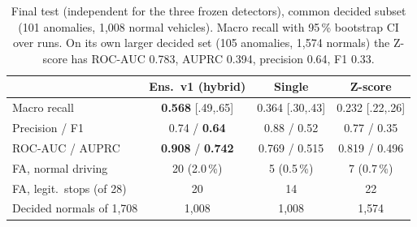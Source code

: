 \documentclass[10pt,a4paper,twocolumn]{article}
\begin{document}
\begin{table}[t]\centering\footnotesize\setlength{\tabcolsep}{1.6pt}
\caption{Final test (independent for the three frozen detectors), common decided subset (101 anomalies, 1{,}008 normal vehicles). Macro recall with 95\,\% bootstrap CI over runs. On its own larger decided set (105 anomalies, 1{,}574 normals) the Z-score has ROC-AUC 0.783, AUPRC 0.394, precision 0.64, F1 0.33.}\label{tab:ft}
\begin{tabular}{@{}lccc@{}}\toprule
 & Ens.\ v1 (hybrid) & Single & Z-score \\\midrule
Macro recall & \textbf{0.568} [.49,.65] & 0.364 [.30,.43] & 0.232 [.22,.26] \\
Precision / F1 & 0.74 / \textbf{0.64} & 0.88 / 0.52 & 0.77 / 0.35 \\
ROC-AUC / AUPRC & \textbf{0.908} / \textbf{0.742} & 0.769 / 0.515 & 0.819 / 0.496 \\
FA, normal driving & 20 (2.0\,\%) & 5 (0.5\,\%) & 7 (0.7\,\%) \\
FA, legit.\ stops (of 28) & 20 & 14 & 22 \\
Decided normals of 1{,}708 & 1{,}008 & 1{,}008 & 1{,}574 \\\bottomrule
\end{tabular}\end{table}
\end{document}
